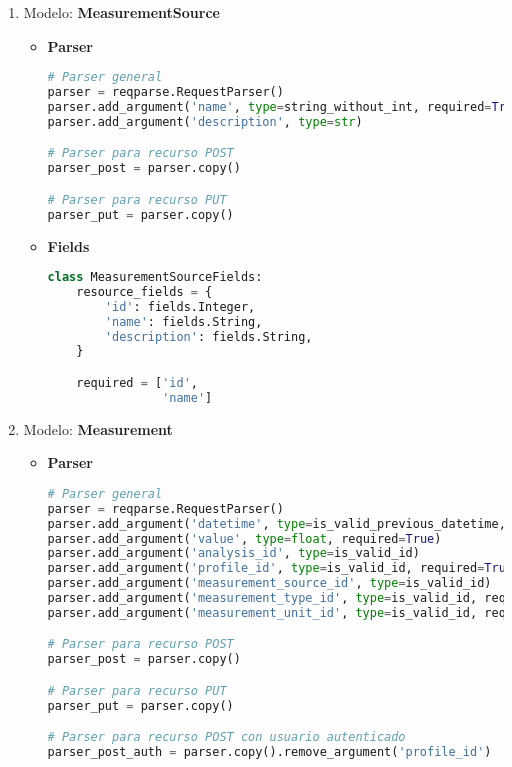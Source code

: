 \begin{enumerate}
\item Modelo: \textbf{MeasurementSource}

\begin{itemize}
	\item \textbf{Parser}
	
\begin{lstlisting}[language=Python]
# Parser general
parser = reqparse.RequestParser()
parser.add_argument('name', type=string_without_int, required=True)
parser.add_argument('description', type=str)

# Parser para recurso POST
parser_post = parser.copy()

# Parser para recurso PUT
parser_put = parser.copy()
\end{lstlisting}

	\item \textbf{Fields}
	
\begin{lstlisting}[language=Python]
class MeasurementSourceFields:
    resource_fields = {
        'id': fields.Integer,
        'name': fields.String,
        'description': fields.String,
    }

    required = ['id',
                'name']

\end{lstlisting}

\end{itemize}

\item Modelo: \textbf{Measurement}

\begin{itemize}
	\item \textbf{Parser}

\begin{lstlisting}[language=Python]
# Parser general
parser = reqparse.RequestParser()
parser.add_argument('datetime', type=is_valid_previous_datetime, required=True)
parser.add_argument('value', type=float, required=True)
parser.add_argument('analysis_id', type=is_valid_id)
parser.add_argument('profile_id', type=is_valid_id, required=True)
parser.add_argument('measurement_source_id', type=is_valid_id)
parser.add_argument('measurement_type_id', type=is_valid_id, required=True)
parser.add_argument('measurement_unit_id', type=is_valid_id, required=True)

# Parser para recurso POST
parser_post = parser.copy()

# Parser para recurso PUT
parser_put = parser.copy()

# Parser para recurso POST con usuario autenticado
parser_post_auth = parser.copy().remove_argument('profile_id')
\end{lstlisting}


\end{itemize}
\end{enumerate}
